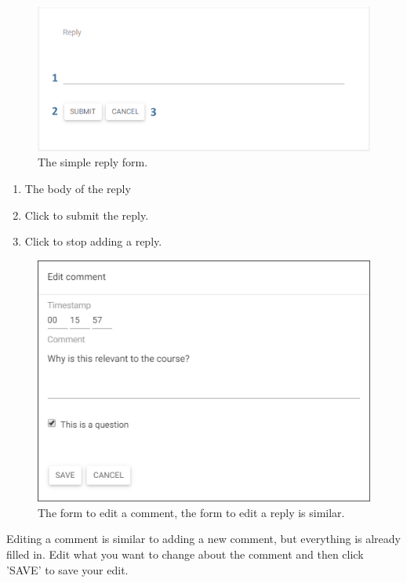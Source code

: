 \documentclass[a4paper,11pt]{report}
\begin{document}
\begin{figure}[H]
\centering
\includegraphics[scale=0.55]{imgs/stu_reply.png}
\caption{The simple reply form.}
\label{fig:stu_reply}
\end{figure}
\begin{enumerate}
\item The body of the reply
\item Click to submit the reply.
\item Click to stop adding a reply.
\end{enumerate}

\begin{figure}[H]
\centering
\includegraphics[scale=0.55]{imgs/stu_edit_comment.png}
\caption{The form to edit a comment, the form to edit a reply is similar.}
\label{fig:stu_edit_comment}
\end{figure}
Editing a comment is similar to adding a new comment, but everything is already filled in. Edit what you want to change about the comment and then click 'SAVE' to save your edit.
\end{document}
